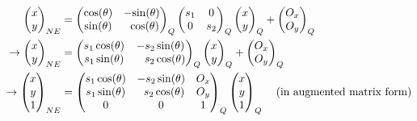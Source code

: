 \documentclass{article}
\begin{document}
\begin{align*}
   \begin{pmatrix}
      x \\
      y
   \end{pmatrix}_{NE}
   &=
   \begin{pmatrix}
      \mathrm{cos}(\theta) & -\mathrm{sin}(\theta) \\
      \mathrm{sin}(\theta) & \;\;\mathrm{cos}(\theta)
   \end{pmatrix}_{Q}
   \begin{pmatrix}
      s_1 &   0  \\
        0 & s_2
   \end{pmatrix}_{Q}
   \begin{pmatrix}
      x \\
      y
   \end{pmatrix}_{Q}
   +
   \begin{pmatrix}
      O_x \\
      O_y
   \end{pmatrix}_{Q} \\
   \rightarrow
   \begin{pmatrix}
      x \\
      y
   \end{pmatrix}_{NE}
   &=
   \begin{pmatrix}
      s_1 \, \mathrm{cos}(\theta)   &       -s_2 \, \mathrm{sin}(\theta)   \\
      s_1 \, \mathrm{sin}(\theta)   & \;\;\; s_2 \, \mathrm{cos}(\theta) 
   \end{pmatrix}_{Q}
   \begin{pmatrix}
      x \\
      y
   \end{pmatrix}_{Q}
   +
   \begin{pmatrix}
      O_x \\
      O_y
   \end{pmatrix}_{Q} \\
   \rightarrow
   \begin{pmatrix}
      x \\
      y \\
      1
   \end{pmatrix}_{NE}
   &=
   \begin{pmatrix}
      s_1 \, \mathrm{cos}(\theta)   &     -s_2 \, \mathrm{sin}(\theta)  & O_x \\
      s_1 \, \mathrm{sin}(\theta)   & \;\; s_2 \, \mathrm{cos}(\theta)  & O_y \\
                  0   &                  0  &   1
   \end{pmatrix}_{Q}
   \begin{pmatrix}
      x \\
      y \\
      1
   \end{pmatrix}_{Q} 
   \;\;\;\; \textrm{(in augmented matrix form)}
\end{align*}
\end{document}
